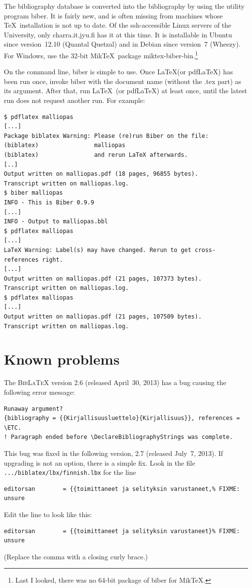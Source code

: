 \documentclass[utf8,bachelor,english]{gradu3}
\begin{document}
The bibliography database is converted into the bibliography by using
the utility program {biber}.  It is fairly new, and is often missing
from machines whose \TeX\ installation is not up to date.  Of the
ssh-accessible Linux servers of the University, only charra.it.jyu.fi
has it at this time.  It is installable in Ubuntu since version~12.10
(Quantal Quetzal) and in Debian since version~7 (Wheezy).  For
Windows, use the 32-bit Mik\TeX\ package
miktex-biber-bin.\footnote{Last I looked, there was no 64-bit package
  of biber for Mik\TeX.}

On the command line, biber is simple to use.  Once \LaTeX (or
pdf\LaTeX) has been run once, invoke biber with the document name
(without the .tex part) as its argument.  After that, run \LaTeX\ (or
pdf\LaTeX) at least once, until the latest run does not request
another run.  For example:

\begingroup\footnotesize
\begin{verbatim}
$ pdflatex malliopas
[...]
Package biblatex Warning: Please (re)run Biber on the file:
(biblatex)                malliopas
(biblatex)                and rerun LaTeX afterwards.
[..]
Output written on malliopas.pdf (18 pages, 96855 bytes).
Transcript written on malliopas.log.
$ biber malliopas
INFO - This is Biber 0.9.9
[...]
INFO - Output to malliopas.bbl
$ pdflatex malliopas
[...]
LaTeX Warning: Label(s) may have changed. Rerun to get cross-references right.
[...]
Output written on malliopas.pdf (21 pages, 107373 bytes).
Transcript written on malliopas.log.
$ pdflatex malliopas
[...]
Output written on malliopas.pdf (21 pages, 107509 bytes).
Transcript written on malliopas.log.
\end{verbatim}
\endgroup

\section{Known problems}

The \textsc{Bib\LaTeX} version 2.6 (released April~30, 2013) has a bug
causing the following error message:%
{\footnotesize%
\begin{verbatim}
Runaway argument?
{bibliography = {{Kirjallisuusluettelo}{Kirjallisuus}}, references = \ETC.
! Paragraph ended before \DeclareBibliographyStrings was complete.
\end{verbatim}
}%
This bug was fixed in the following version, 2.7 (released July~7,
2013).  If upgrading is not an option, there is a simple fix.  Look in
the file \texttt{.../biblatex/lbx/finnish.lbx} for the line
{\footnotesize%
\begin{verbatim}
editorsan        = {{toimittaneet ja selityksin varustaneet,% FIXME: unsure
\end{verbatim}
}%
Edit the line to look like this:
{\footnotesize%
\begin{verbatim}
editorsan        = {{toimittaneet ja selityksin varustaneet}% FIXME: unsure
\end{verbatim}
}%
(Replace the comma with a closing curly brace.)
\end{document}
